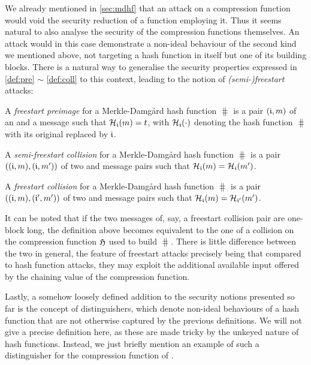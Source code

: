 \bigskip

We already mentioned in \autoref{sec:mdhf} that an attack on a compression function would void the security reduction of a \merkdam function employing it. Thus it seems natural to also
analyse the security of the compression functions themselves. An attack would in this case demonstrate a non-ideal behaviour of the second kind we mentioned above, not targeting
a hash function in itself but one of its building blocks. There is a natural way to generalise the security properties expressed in \autoref{def:pre} $\sim$ \autoref{def:coll} to this context,
leading to the notion of \emph{(semi-)freestart} attacks:

\begin{defi}
A \emph{freestart preimage} for a Merkle-Damg\aa rd hash function $\hash$ is a pair $(\mathfrak{i},m)$
of an \iv and a message such that $\operatorname{\mathcal{H}}_{\mathfrak{i}}(m) = t$, with $\operatorname{\mathcal{H}}_{\mathfrak{i}}(\cdot)$ denoting
the hash function $\hash$ with its original \iv replaced by $\mathfrak{i}$.
\label{def:free_pre}
\end{defi}

\begin{defi}
A \emph{semi-freestart collision} for a Merkle-Damg\aa rd hash function $\hash$ is a pair $((\mathfrak{i},m), (\mathfrak{i},m'))$
of two \iv and message pairs such that $\operatorname{\mathcal{H}}_{\mathfrak{i}}(m) = \operatorname{\mathcal{H}}_{\mathfrak{i}}(m')$.
\label{def:semi-free_coll}
\end{defi}

\begin{defi}
A \emph{freestart collision} for a Merkle-Damg\aa rd hash function $\hash$ is a pair $((\mathfrak{i},m), (\mathfrak{i}',m'))$
of two \iv and message pairs such that $\operatorname{\mathcal{H}}_{\mathfrak{i}}(m) = \operatorname{\mathcal{H}}_{\mathfrak{i}'}(m')$.
\label{def:free_coll}
\end{defi}

It can be noted that if the two messages of, say, a freestart collision pair are one-block long, the definition above becomes equivalent to the one of a collision
on the compression function $\operatorname{\mathfrak{H}}$ used to build $\hash$.
There is little difference between the two in general, the feature of freestart attacks precisely being that compared to hash function attacks, they may exploit the additional available input offered by the chaining value
of the compression function.


\bigskip

Lastly, a somehow loosely defined addition to the security notions presented so far is the concept of distinguishers, which denote non-ideal behaviours
of a hash function that are not otherwise captured by the previous definitions. We will not give a precise definition here, as these are made tricky by
the unkeyed nature of hash functions. Instead, we just briefly mention an example of such a distinguisher for the compression function of \shaone.

